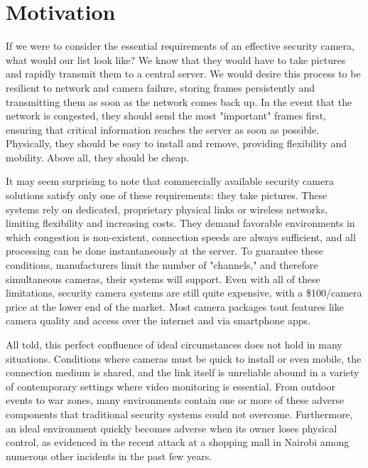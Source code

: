 \section{Motivation}
If we were to consider the essential requirements of an
effective security camera, what would our list look like?
We know that they would have to take pictures and
rapidly transmit them to a central server.  We would desire
this process to be resilient to network and camera failure,
storing frames persistently and transmitting them as soon
as the network comes back up.  In the event that the network
is congested, they should send the most "important" frames
first, ensuring that critical information reaches the server as
soon as possible.  Physically, they should be easy to install and remove,
providing flexibility and mobility.  Above all, they should be cheap.

It may seem surprising to note that commercially available
security camera solutions satisfy only one of these requirements:
they take pictures.  These systems rely on dedicated, proprietary
physical links or wireless networks, limiting flexibility and increasing
costs.  They demand favorable environments in which congestion
is non-existent, connection speeds are always sufficient, and all processing
can be done instantaneously at the server.  To guarantee these
conditions, manufacturers limit the number of "channels," and therefore
simultaneous cameras, their systems will support.  Even with all of these 
limitations, security camera systems are still quite expensive, with a
\$100/camera price at the lower end of the market.  Most camera
packages tout features like camera quality and access over the internet and
via smartphone apps.

All told, this perfect confluence of ideal circumstances does not hold in
many situations.  Conditions where cameras must be quick to install or even mobile, the 
connection medium is shared, and the link itself is unreliable abound in a variety 
of contemporary settings where video monitoring is essential.  From outdoor 
events to war zones, many environments contain one or more of these adverse 
components that traditional security systems could not overcome.  Furthermore, 
an ideal environment quickly becomes adverse when its owner loses physical 
control, as evidenced in the recent attack at a shopping mall in Nairobi among 
numerous other incidents in the past few years.

